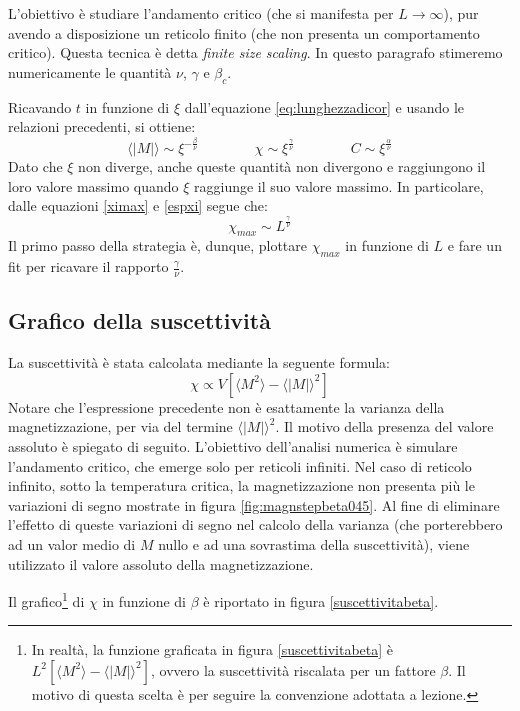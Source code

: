 \documentclass[10pt,a4paper]{article}
\begin{document}
L'obiettivo è studiare l'andamento critico (che si manifesta per $L\rightarrow\infty$), pur avendo a disposizione un reticolo finito (che non presenta un comportamento critico). Questa tecnica è detta \emph{finite size scaling}. In questo paragrafo stimeremo numericamente le quantità $\nu$, $\gamma$ e $\beta_c$.

Ricavando $t$ in funzione di $\xi$ dall'equazione \ref{eq:lunghezzadicor} e usando le relazioni precedenti, si ottiene:
\begin{equation}\label{espxi}
\langle |M| \rangle\sim \xi^{-\frac{\beta}{\nu}}  \qquad \qquad \chi\sim \xi^{\frac{\gamma}{\nu}}  \qquad \qquad C\sim \xi^{\frac{\alpha}{\nu}}
\end{equation}
Dato che $\xi$ non diverge, anche queste quantità non divergono e raggiungono il loro valore massimo quando $\xi$ raggiunge il suo valore massimo. In particolare, dalle equazioni \ref{ximax} e \ref{espxi} segue che:
\begin{equation*}
 \chi_{max}\sim L^{\frac{\gamma}{\nu}}  
\end{equation*}
Il primo passo della strategia è, dunque, plottare $\chi_{max}$ in funzione di $L$ e fare un fit per ricavare il rapporto $\frac{\gamma}{\nu}$.
\subsection*{Grafico della suscettività}\label{ds}
La suscettività è stata calcolata mediante la seguente formula:
\begin{equation*}
\chi\propto V[\langle M ^2 \rangle - \langle |M|\rangle^2] 
\end{equation*}
Notare che l'espressione precedente non è esattamente la varianza della magnetizzazione, per via del termine $\langle |M|\rangle^2$. Il motivo della presenza del valore assoluto è spiegato di seguito. L'obiettivo dell'analisi numerica è simulare l'andamento critico, che emerge solo per reticoli infiniti. Nel caso di reticolo infinito, sotto la temperatura critica, la magnetizzazione non presenta più le variazioni di segno mostrate in figura \ref{fig:magnstepbeta045}. Al fine di eliminare l'effetto di queste variazioni di segno nel calcolo della varianza (che porterebbero ad un valor medio di $M$ nullo e ad una sovrastima della suscettività), viene utilizzato il valore assoluto della magnetizzazione.

Il grafico\footnote{In realtà, la funzione graficata in figura \ref{suscettivitabeta} è $L^2[\langle M ^2 \rangle - \langle |M|\rangle^2]$, ovvero la suscettività riscalata per un fattore $\beta$.  Il motivo di questa scelta è per seguire la convenzione adottata a lezione. } di $\chi$ in funzione di $\beta$ è riportato in figura \ref{suscettivitabeta}. 
\end{document}
